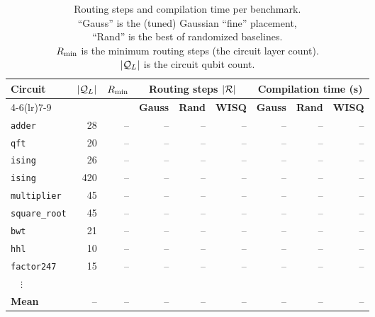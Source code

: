 \begin{table}[t]
    \centering
    \caption{Routing steps and compilation time per benchmark.\\[2pt]
    ``Gauss'' is the (tuned) Gaussian ``fine'' placement,\\
    ``Rand'' is the best of  randomized baselines. \\
    $R_{\min}$ is the minimum routing steps (the circuit layer count).\\
    $|\mathcal{Q}_L|$ is the circuit qubit count.\\
    }
    \label{tab:results}
    \setlength{\tabcolsep}{3pt}
    \scriptsize
    \begin{tabular}{l r r rrr rrr}
        \toprule
        \textbf{Circuit} & \textbf{$|\mathcal{Q}_L|$} & \textbf{$R_{\min}$}
            & \multicolumn{3}{c}{\textbf{Routing steps} $|\mathcal{R}|$}
            & \multicolumn{3}{c}{\textbf{Compilation time (s)}} \\
        \cmidrule(lr){4-6}\cmidrule(lr){7-9}
            & & & \textbf{Gauss} & \textbf{Rand} & \textbf{WISQ}
              & \textbf{Gauss} & \textbf{Rand} & \textbf{WISQ} \\
        \midrule
        \texttt{adder}        & 28 & -- & -- & -- & -- & -- & -- & -- \\
        \texttt{qft}          & 20 & -- & -- & -- & -- & -- & -- & -- \\
        \texttt{ising}        & 26 & -- & -- & -- & -- & -- & -- & -- \\
        \texttt{ising}       & 420 & -- & -- & -- & -- & -- & -- & -- \\
        \texttt{multiplier}   & 45 & -- & -- & -- & -- & -- & -- & -- \\
        \texttt{square\_root} & 45 & -- & -- & -- & -- & -- & -- & -- \\
        \texttt{bwt}          & 21 & -- & -- & -- & -- & -- & -- & -- \\
        \texttt{hhl}          & 10 & -- & -- & -- & -- & -- & -- & -- \\
        \texttt{factor247}    & 15 & -- & -- & -- & -- & -- & -- & -- \\
        ~~$\vdots$ & & & & & & & & \\
        \midrule
        \textbf{Mean}    & -- & -- & -- & -- & -- & -- & -- & -- \\
        \bottomrule
    \end{tabular}
    \vspace{-0.2cm}
\end{table}
